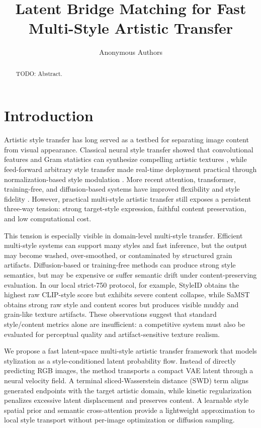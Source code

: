 \documentclass{article}
\title{Latent Bridge Matching for Fast Multi-Style Artistic Transfer}
\author{Anonymous Authors}
\date{}
\begin{document}
\maketitle

\begin{abstract}
TODO: Abstract.
\end{abstract}

\section{Introduction}
Artistic style transfer has long served as a testbed for separating image content from visual appearance. Classical neural style transfer showed that convolutional features and Gram statistics can synthesize compelling artistic textures \cite{gatys2016image}, while feed-forward arbitrary style transfer made real-time deployment practical through normalization-based style modulation \cite{huang2017adain}. More recent attention, transformer, training-free, and diffusion-based systems have improved flexibility and style fidelity \cite{park2019sanet,deng2022stytr2,hong2023aespa,huang2024aesfa,gim2024cast,chung2024styleid}. However, practical multi-style artistic transfer still exposes a persistent three-way tension: strong target-style expression, faithful content preservation, and low computational cost.

This tension is especially visible in domain-level multi-style transfer. Efficient multi-style systems can support many styles and fast inference, but the output may become washed, over-smoothed, or contaminated by structured grain artifacts. Diffusion-based or training-free methods can produce strong style semantics, but may be expensive or suffer semantic drift under content-preserving evaluation. In our local strict-750 protocol, for example, StyleID obtains the highest raw CLIP-style score but exhibits severe content collapse, while SaMST obtains strong raw style and content scores but produces visible muddy and grain-like texture artifacts. These observations suggest that standard style/content metrics alone are insufficient: a competitive system must also be evaluated for perceptual quality and artifact-sensitive texture realism.

We propose a fast latent-space multi-style artistic transfer framework that models stylization as a style-conditioned latent probability flow. Instead of directly predicting RGB images, the method transports a compact VAE latent through a neural velocity field. A terminal sliced-Wasserstein distance (SWD) term aligns generated endpoints with the target artistic domain, while kinetic regularization penalizes excessive latent displacement and preserves content. A learnable style spatial prior and semantic cross-attention provide a lightweight approximation to local style transport without per-image optimization or diffusion sampling.
\end{document}
